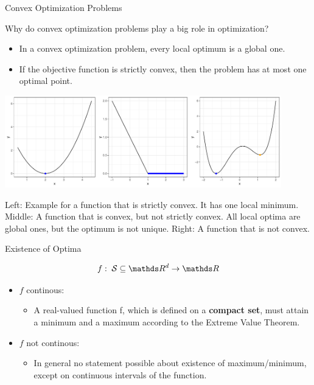   \begin{vbframe}{Convex Optimization Problems}
  
  Why do convex optimization problems play a big role in optimization? 
  
  \begin{itemize}
    \item In a convex optimization problem, every local optimum is a global one.  
    \item If the objective function is strictly convex, then the problem has at most one optimal point. 
  \end{itemize}
  
  \begin{center}
  \includegraphics[width = 0.9\textwidth]{figure_man/convexity_3.pdf} \\
  \begin{footnotesize}
  Left: Example for a function that is strictly convex. It has one local minimum. Middle: A function that is convex, but not strictly convex. All local optima are global ones, but the optimum is not unique. Right: A function that is not convex. 
  \end{footnotesize} 
  \end{center}
  
  \end{vbframe}
  
  
  \begin{vbframe}{Existence of Optima}
  
  $$
  f: \; \mathcal{S} \subseteq \R^d \to \R
  $$
  
  \begin{itemize}
  \item $f$ continous:
  \begin{itemize}
  \item A real-valued function f, which is defined on a \textbf{compact set}, must attain a minimum and a maximum according to the Extreme Value Theorem.
  \end{itemize}
  \item $f$ not continous:
  \begin{itemize}
  \item In general no statement possible about existence of maximum/minimum, except on continuous intervals of the function.
  \end{itemize}
  \end{itemize}
  
  
  \end{vbframe}
  
